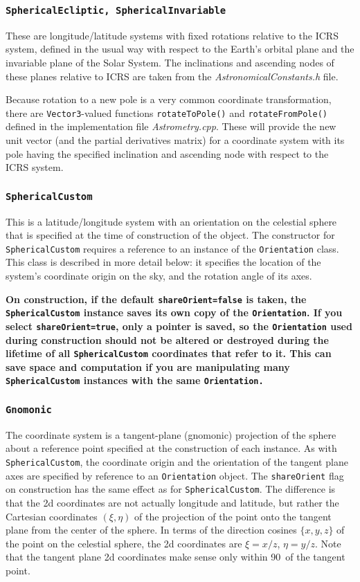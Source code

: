 \documentclass[11pt,preprint,flushrt]{aastex}
\begin{document}
\subsubsection{\tt SphericalEcliptic, SphericalInvariable}
These are longitude/latitude systems with fixed rotations relative to the ICRS system, defined in the usual way with respect to the Earth's orbital plane and the invariable plane of the Solar System.  The inclinations and ascending nodes of these planes relative to ICRS are taken from the {\it AstronomicalConstants.h} file.

Because rotation to a new pole is a very common coordinate transformation, there are {\tt Vector3}-valued functions {\tt rotateToPole()} and {\tt rotateFromPole()} defined in the implementation file {\it Astrometry.cpp}.  These will provide the new unit vector (and the partial derivatives matrix) for a coordinate system with its pole having the specified inclination and ascending node with respect to the ICRS system.  

\subsubsection{\tt SphericalCustom}
This is a latitude/longitude system with an orientation on the celestial sphere that is specified at the time of construction of the object.  The constructor for {\tt SphericalCustom} requires a reference to an instance of the {\tt Orientation} class.  This class is described in more detail below: it specifies the location of the system's coordinate origin on the sky, and the rotation angle of its axes.  

{\bf On construction, if the default {\tt shareOrient=false} is taken, the {\tt SphericalCustom} instance saves its own copy of the {\tt Orientation}.  If you select {\tt shareOrient=true}, only a pointer is saved, so the {\tt Orientation} used during construction should not be altered or destroyed during the lifetime of all {\tt SphericalCustom} coordinates that refer to it.  This can save space and computation if you are manipulating many {\tt SphericalCustom} instances with the same {\tt Orientation.}}

\subsubsection{\tt Gnomonic}
The coordinate system is a tangent-plane (gnomonic) projection of the sphere about a reference point specified at the construction of each instance.  As with {\tt SphericalCustom}, the coordinate origin and the orientation of the tangent plane axes are specified by reference to an {\tt Orientation} object.  The {\tt shareOrient} flag on construction has the same effect as for {\tt SphericalCustom}.
 The difference is that the 2d coordinates are not actually longitude and latitude, but rather the Cartesian coordinates $(\xi,\eta)$ of the projection of the point onto the tangent plane from the center of the sphere.  In terms of the direction cosines $\{x,y,z\}$ of the point on the celestial sphere, the 2d coordinates are $\xi=x/z$, $\eta=y/z$.  Note that the tangent plane 2d coordinates make sense only within 90\arcdeg\ of the tangent point.
\end{document}

